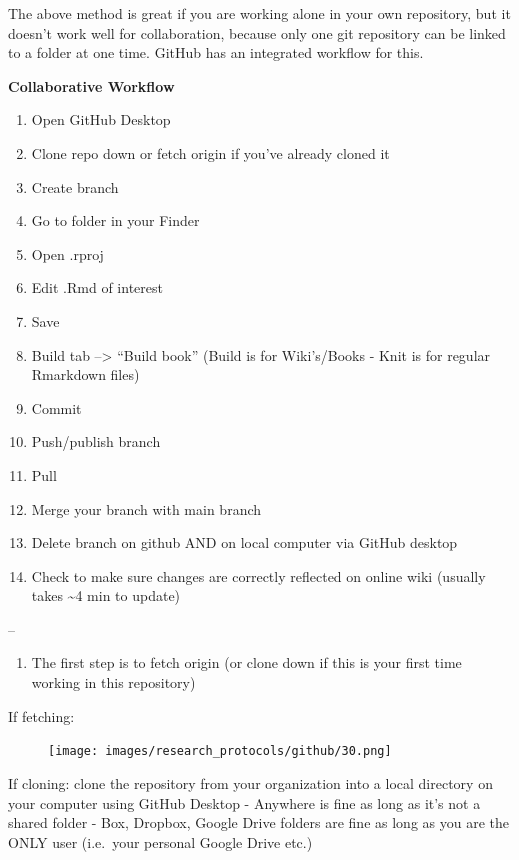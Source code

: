 \documentclass[
]{book}
\providecommand{\tightlist}{%
  \setlength{\itemsep}{0pt}\setlength{\parskip}{0pt}}
\begin{document}
The above method is great if you are working alone in your own repository, but it doesn't work well for collaboration, because only one git repository can be linked to a folder at one time. GitHub has an integrated workflow for this.

\textbf{Collaborative Workflow}

\begin{enumerate}
\def\labelenumi{\arabic{enumi}.}
\tightlist
\item
  Open GitHub Desktop
\item
  Clone repo down or fetch origin if you've already cloned it
\item
  Create branch
\item
  Go to folder in your Finder
\item
  Open .rproj
\item
  Edit .Rmd of interest
\item
  Save
\item
  Build tab --\textgreater{} ``Build book'' (Build is for Wiki's/Books - Knit is for regular Rmarkdown files)
\item
  Commit
\item
  Push/publish branch
\item
  Pull
\item
  Merge your branch with main branch
\item
  Delete branch on github AND on local computer via GitHub desktop
\item
  Check to make sure changes are correctly reflected on online wiki (usually takes \textasciitilde4 min to update)
\end{enumerate}

--

\begin{enumerate}
\def\labelenumi{\arabic{enumi}.}
\tightlist
\item
  The first step is to fetch origin (or clone down if this is your first time working in this repository)
\end{enumerate}

If fetching:

\begin{figure}
\centering
\texttt{[image: images/research\_protocols/github/30.png]}
\caption{}
\end{figure}

If cloning: clone the repository from your organization into a local directory on your computer using GitHub Desktop
- Anywhere is fine as long as it's not a shared folder
- Box, Dropbox, Google Drive folders are fine as long as you are the ONLY user (i.e.~your personal Google Drive etc.)
\end{document}
